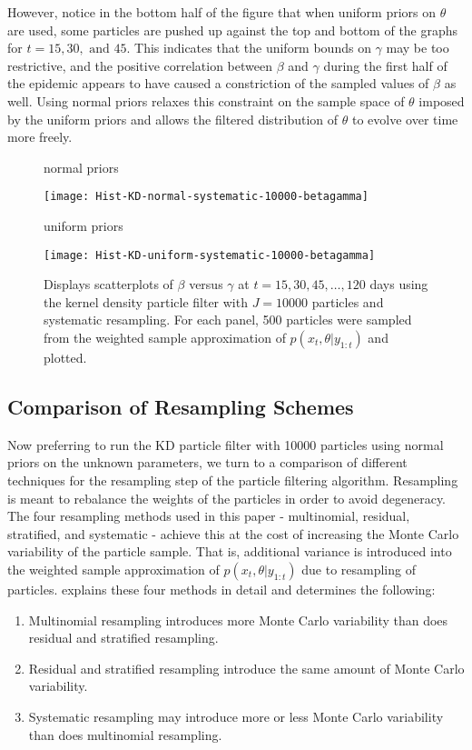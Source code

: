 \documentclass{elsarticle}
\begin{document}
However, notice in the bottom half of the figure that when uniform priors on $\theta$ are used, some particles are pushed up against the top and bottom of the graphs for $t = 15, 30, \mbox{ and } 45$.  This indicates that the uniform bounds on $\gamma$ may be too restrictive, and the positive correlation between $\beta$ and $\gamma$ during the first half of the epidemic appears to have caused a constriction of the sampled values of $\beta$ as well.  Using normal priors relaxes this constraint on the sample space of $\theta$ imposed by the uniform priors and allows the filtered distribution of $\theta$ to evolve over time more freely.

\begin{figure}
\centering
\begin{minipage}{1.0\linewidth}
\caption*{normal priors}
\texttt{[image: Hist-KD-normal-systematic-10000-betagamma]}
\end{minipage}
\begin{minipage}{1.0\linewidth}
\caption*{uniform priors}
\texttt{[image: Hist-KD-uniform-systematic-10000-betagamma]}
\end{minipage}
\caption{Displays scatterplots of $\beta$ versus $\gamma$ at $t = 15, 30, 45,\ldots,120$ days using the kernel density particle filter with $J = 10000$ particles and systematic resampling.  For each panel, 500 particles were sampled from the weighted sample approximation of $p(x_t,\theta|y_{1:t})$ and plotted.} \label{fig:priors}
\end{figure}

\subsection{Comparison of Resampling Schemes}

Now preferring to run the KD particle filter with 10000 particles using normal priors on the unknown parameters, we turn to a comparison of different techniques for the resampling step of the particle filtering algorithm.  Resampling is meant to rebalance the weights of the particles in order to avoid degeneracy.  The four resampling methods used in this paper - multinomial, residual, stratified, and systematic - achieve this at the cost of increasing the Monte Carlo variability of the particle sample.  That is, additional variance is introduced into the weighted sample approximation of $p(x_t,\theta|y_{1:t})$ due to resampling of particles.  \citet{Douc:Capp:Moul:comp:2005} explains these four methods in detail and determines the following:
\begin{enumerate}
\item Multinomial resampling introduces more Monte Carlo variability than does residual and stratified resampling.
\item Residual and stratified resampling introduce the same amount of Monte Carlo variability.
\item Systematic resampling may introduce more or less Monte Carlo variability than does multinomial resampling.
\end{enumerate}
\end{document}
